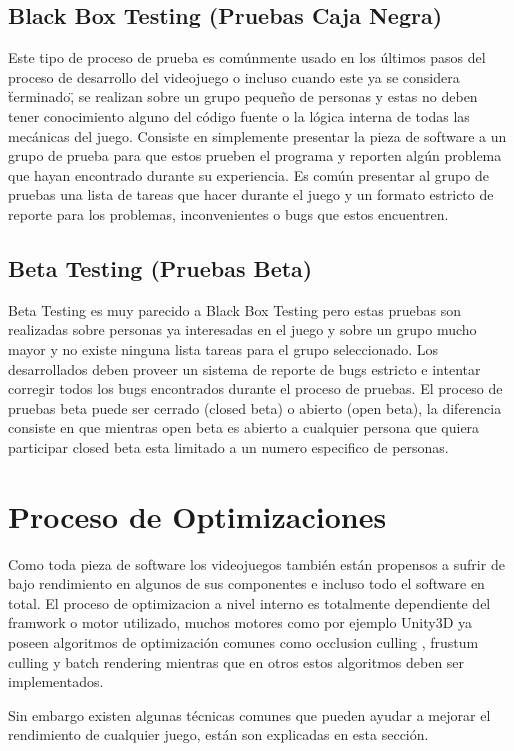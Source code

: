 \subsection{Black Box Testing (Pruebas Caja Negra)}
Este tipo de proceso de prueba es comúnmente usado en los últimos pasos del proceso de desarrollo del videojuego o incluso cuando este ya se considera  \"terminado\", se realizan sobre un grupo pequeño de personas y estas no deben tener conocimiento alguno del código fuente o la lógica interna de todas las mecánicas del juego. Consiste en simplemente presentar la pieza de software a un grupo de prueba para que estos prueben el programa y reporten algún problema que hayan encontrado durante su experiencia. Es común presentar al grupo de pruebas una lista de tareas que hacer durante el juego y un formato estricto de reporte para los problemas, inconvenientes o bugs que estos encuentren.
\subsection{Beta Testing (Pruebas Beta)}
Beta Testing es muy parecido a Black Box Testing pero estas pruebas son realizadas sobre personas ya interesadas en el juego y sobre un grupo mucho mayor y no existe ninguna lista tareas para el grupo seleccionado. Los desarrollados deben proveer un sistema de reporte de bugs estricto e intentar corregir todos los bugs encontrados durante el proceso de pruebas. El proceso de pruebas beta puede ser cerrado (closed beta) o abierto (open beta), la diferencia consiste en que mientras open beta es abierto a cualquier persona que quiera participar closed beta esta limitado a un numero especifico de personas. 

\section{Proceso de Optimizaciones}
Como toda pieza de software los videojuegos también están propensos a sufrir de bajo rendimiento en algunos de sus componentes e incluso todo el software en total. El proceso de optimizacion a nivel interno es totalmente dependiente del framwork o motor utilizado, muchos motores como por ejemplo Unity3D ya poseen algoritmos de optimización comunes como occlusion culling \cite{unity_culling}, frustum culling \cite{unity_camera} y batch rendering \cite{unity_batch} mientras que en otros estos algoritmos deben ser implementados.

Sin embargo existen algunas técnicas comunes que pueden ayudar a mejorar el rendimiento de cualquier juego, están son explicadas en esta sección.


